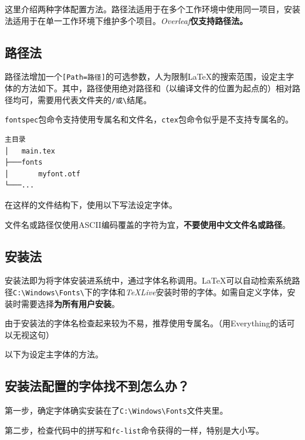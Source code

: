\documentclass[10pt,openany]{book}
\begin{document}
\begin{sloppypar}
这里介绍两种字体配置方法。路径法适用于在多个工作环境中使用同一项目，安装法适用于在单一工作环境下维护多个项目。\textit{Overleaf}\textbf{仅支持路径法。}

\subsection{路径法}

路径法增加一个\texttt{{[}Path=路径{]}}的可选参数，人为限制{\LaTeX}的搜索范围，设定主字体的方法如下。其中，路径使用绝对路径和（以编译文件的位置为起点的）相对路径均可，需要用代表文件夹的\texttt{/或\textbackslash{}}结尾。

\texttt{fontspec}包命令支持使用专属名和文件名，\texttt{ctex}包命令似乎是不支持专属名的。

\begin{lstlisting}[title=文件结构示例]
主目录
│   main.tex
├───fonts
│       myfont.otf
└───...
\end{lstlisting}

在这样的文件结构下，使用以下写法设定字体。



文件名或路径仅使用ASCII编码覆盖的字符为宜，\textbf{不要使用中文文件名或路径}。

\subsection{安装法}

安装法即为将字体安装进系统中，通过字体名称调用。{\LaTeX}可以自动检索系统路径\texttt{C:\textbackslash{}Windows\textbackslash{}Fonts\textbackslash{}}下的字体和\textit{TeXLive}安装时带的字体。如需自定义字体，安装时需要选择\textbf{为所有用户安装}。

由于安装法的字体名检查起来较为不易，推荐使用专属名。（用Everything的话可以无视这句）

以下为设定主字体的方法。



\subsection{安装法配置的字体找不到怎么办？}

第一步，确定字体确实安装在了\texttt{C:\textbackslash{}Windows\textbackslash{}Fonts}文件夹里。

第二步，检查代码中的拼写和\texttt{fc-list}命令获得的一样，特别是大小写。


\end{sloppypar}
\end{document}
